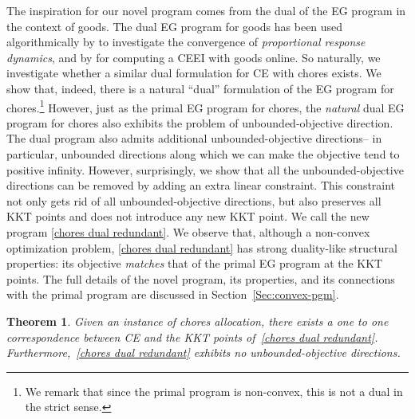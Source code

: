 \documentclass[format=acmsmall,authorversion]{acmart}
\newtheorem*{theorem*}{Theorem}
\newcommand{\notename}[2]{{\textcolor{blue}{\footnotesize{\bf (#1:} {#2}{\bf ) }}}}
\newcommand{\RM}[1]{{\notename{RM}{#1}}}
\newcommand{\infd}{unbounded-objective direction}
\begin{document}

The inspiration for our novel program comes from the dual of the EG program in the context of goods. The dual EG program for goods has been used algorithmically by \citet{birnbaum2011distributed} to investigate the convergence of \emph{proportional response dynamics}, and by \citet{gao2021online} for computing a CEEI with goods online. So naturally, we investigate whether a similar dual formulation for CE with chores exists. We show that, indeed, there is a natural ``dual'' formulation of the EG program for chores.\footnote{We remark that since the primal program is non-convex, this is not a dual in the strict sense.} However, just as the primal EG program for chores, the {\em natural} dual EG program for chores also exhibits the problem of \infd. The dual program also admits additional \infd s-- in particular, unbounded directions along which we can make the objective tend to positive infinity. However, surprisingly, we show that all the \infd s can be removed by adding an extra linear constraint. This constraint not only gets rid of all \infd s, but also preserves all KKT points and does not introduce any new KKT point. We call the new program \ref{chores dual redundant}. We observe that, although a non-convex optimization problem, \ref{chores dual redundant} has strong duality-like structural properties: %
its objective {\em matches} that of the primal EG program at the KKT points. The full details of the novel program, its properties, and its connections with the primal program are discussed in Section~\ref{Sec:convex-pgm}. 

\begin{theorem*}
    \label{theorem-intro-convexpgm}
    Given an instance of chores allocation, there exists a one to one correspondence between CE and the KKT points of~\ref{chores dual redundant}. Furthermore,~\ref{chores dual redundant} exhibits no \infd s.
\end{theorem*}
\end{document}
